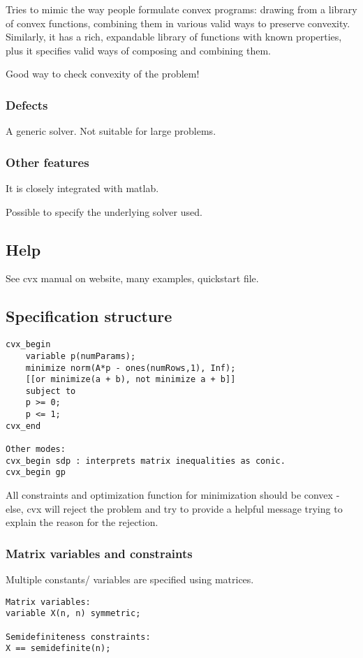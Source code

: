 \documentclass[oneside, article]{memoir}
\begin{document}
Tries to mimic the way people formulate convex programs: drawing from a library of convex functions, combining them in various valid ways to preserve convexity. Similarly, it has a rich, expandable library of functions with known properties, plus it specifies valid ways of composing and combining them.

Good way to check convexity of the problem!

\subsubsection{Defects}
A generic solver. Not suitable for large problems.

\subsubsection{Other features}
It is closely integrated with matlab.

Possible to specify the underlying solver used.

\subsection{Help}
See cvx manual on website, many examples, quickstart file.

\subsection{Specification structure}
\begin{lstlisting}
cvx_begin
    variable p(numParams);
    minimize norm(A*p - ones(numRows,1), Inf);
    [[or minimize(a + b), not minimize a + b]]
    subject to
    p >= 0;
    p <= 1;
cvx_end

Other modes:
cvx_begin sdp : interprets matrix inequalities as conic.
cvx_begin gp
\end{lstlisting}

All constraints and optimization function for minimization should be convex - else, cvx will reject the problem and try to provide a helpful message trying to explain the reason for the rejection.

\subsubsection{Matrix variables and constraints}
Multiple constants/ variables are specified using matrices.

\begin{verbatim}
Matrix variables:
variable X(n, n) symmetric;

Semidefiniteness constraints:
X == semidefinite(n);
\end{verbatim}
\end{document}
